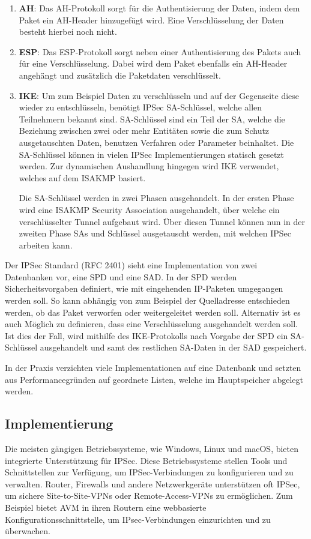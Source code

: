 \begin{enumerate}
    \item \textbf{\gls{AH}}: Das \gls{AH}-Protokoll sorgt für die Authentisierung der Daten, indem dem Paket ein \gls{AH}-Header hinzugefügt wird. Eine Verschlüsselung der Daten besteht hierbei noch nicht.
    \item \textbf{\gls{ESP}}: Das \gls{ESP}-Protokoll sorgt neben einer Authentisierung des Pakets auch für eine Verschlüsselung. Dabei wird dem Paket ebenfalls ein \gls{AH}-Header angehängt und zusätzlich die Paketdaten verschlüsselt.
    \item \textbf{\gls{IKE}}: Um zum Beispiel Daten zu verschlüsseln und auf der Gegenseite diese wieder zu entschlüsseln, benötigt \gls{IPSec} \gls{SA}-Schlüssel, welche allen Teilnehmern bekannt sind. \gls{SA}-Schlüssel sind ein Teil der \acrfull{SA}, welche die Beziehung zwischen zwei oder mehr Entitäten sowie die zum Schutz ausgetauschten Daten, benutzen Verfahren oder Parameter beinhaltet. Die \gls{SA}-Schlüssel können in vielen \gls{IPSec} Implementierungen statisch gesetzt werden. Zur dynamischen Aushandlung hingegen wird \acrfull{IKE} verwendet, welches auf dem \gls{ISAKMP} basiert.

    Die \gls{SA}-Schlüssel werden in zwei Phasen ausgehandelt. In der ersten Phase wird eine \gls{ISAKMP} Security Association ausgehandelt, über welche ein verschlüsselter Tunnel aufgebaut wird. Über diesen Tunnel können nun in der zweiten Phase \gls{SA}s und Schlüssel ausgetauscht werden, mit welchen \gls{IPSec} arbeiten kann.
\end{enumerate}

Der \gls{IPSec} Standard (\gls{RFC} 2401) sieht eine Implementation von zwei Datenbanken vor, eine \gls{SPD} und eine \gls{SAD}. In der \gls{SPD} werden  Sicherheitsvorgaben definiert, wie mit eingehenden \gls{IP}-Paketen umgegangen werden soll. So kann abhängig von zum Beispiel der Quelladresse entschieden werden, ob das Paket verworfen oder weitergeleitet werden soll. Alternativ ist es auch Möglich zu definieren, dass eine Verschlüsselung ausgehandelt werden soll. Ist dies der Fall, wird mithilfe des \gls{IKE}-Protokolls nach Vorgabe der \gls{SPD} ein \gls{SA}-Schlüssel ausgehandelt und samt des restlichen \gls{SA}-Daten in der \gls{SAD} gespeichert.

In der Praxis verzichten viele Implementationen auf eine Datenbank und setzten aus Performancegründen auf geordnete Listen, welche im Hauptspeicher abgelegt werden.

\subsection{Implementierung}
Die meisten gängigen Betriebssysteme, wie Windows, Linux und macOS, bieten integrierte Unterstützung für \gls{IPSec}. Diese Betriebssysteme stellen Tools und Schnittstellen zur Verfügung, um \gls{IPSec}-Verbindungen zu konfigurieren und zu verwalten. Router, Firewalls und andere Netzwerkgeräte unterstützen oft \gls{IPSec}, um sichere Site-to-Site-\gls{VPN}s oder Remote-Access-\gls{VPN}s zu ermöglichen. Zum Beispiel bietet AVM in ihren Routern eine webbasierte Konfigurationsschnittstelle, um IPsec-Verbindungen einzurichten und zu überwachen.

